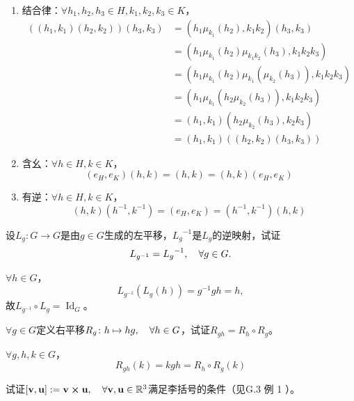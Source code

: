 \begin{xiti}
    \begin{zm}
    	\begin{enumerate}
    		\item 结合律：$\forall h_1 , h_2 , h_3 \in H , k_1 , k_2 , k_3 \in K $，
    		\begin{align*}
    		\left( (h_1,k_1) (h_2,k_2) \right) (h_3 , k_3) &= \left(h_1 \mu_{k_1}(h_2), k_1 k_2 \right) (h_3,k_3)\\
    		&= \left( h_1 \mu_{k_1}(h_2) \mu_{k_1 k_2}(h_3) , k_1 k_2 k_3 \right)\\
    		&= \left( h_1 \mu_{k_1}(h_2) \mu_{k_1}\left( \mu_{k_2}(h_3) \right)  , k_1 k_2 k_3 \right)\\
    		&= \left( h_1 \mu_{k_1}(h_2 \mu_{k_2}(h_3)) , k_1 k_2 k_3 \right)\\
    		&= (h_1,k_1) \left( h_2 \mu_{k_2}(h_3) , k_2 k_3 \right)\\
    		&= (h_1,k_1) \left( (h_2,k_2) (h_3,k_3) \right)
    		\end{align*}
    		\item 含幺：$\forall h \in H, k\in K $，
    		\[ (e_H,e_K) (h,k) = (h,k) = (h,k) (e_H,e_K) \]
    		\item 有逆：$\forall h \in H,k \in K $，
    		\[ (h,k) (h^{-1},k^{-1}) = (e_H,e_K) = (h^{-1} ,k^{-1}) (h,k) \]
    	\end{enumerate}
    \end{zm}
	
	\item 设$L_g \colon G \rightarrow G $是由$g\in G $生成的左平移，${L_g}^{-1} $是$L_g$的逆映射，试证\[ L_{g^{-1}} = {L_g}^{-1}\qc \forall g\in G. \]
	
	\begin{zm}
		$\forall h\in G $，
		\[ L_{g^{-1}} \left(L_g(h)\right) = g^{-1} gh=h, \]
		故$L_{g^{-1}} \circ L_{g} =\operatorname{Id}_G $。
	\end{zm}
	
	\item $\forall g \in G $定义右平移$ R_g \colon h \mapsto hg \qc{\forall h \in G} $，试证$R_{gh} = R_{h} \circ R_g $。
	
	\begin{zm}
		$\forall g,h,k\in G$，\[ R_{gh}(k) = kgh=R_{h}\circ R_g (k) \]
	\end{zm}
    
    \item 试证$[\myvec{v},\myvec{u}]:= \myvec{v} \cp \myvec{u} \qc \forall \myvec{v} ,\myvec{u} \in \mathbb{R}^3 $满足李括号的条件（见\textsection G.3 例 1 ）。
    

\end{xiti}
